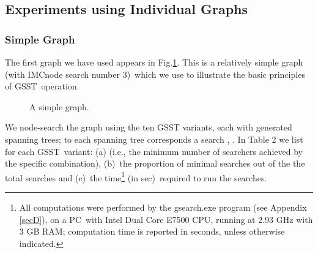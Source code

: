 \documentclass[11pt]{article}\usepackage{amsmath}
\begin{document}
\subsection{Experiments using Individual Graphs}

\label{sec0601}

\subsubsection{Simple Graph}

The first graph we have used appears in Fig.\ref{fig02}. This is a relatively
simple graph (with IMCnode search number 3)\ which we use to
illustrate the basic principles of GSST\ operation.

\begin{figure}[h]
\centering
{}\caption{A simple graph.}\label{fig02}\end{figure}

We node-search the graph using the ten GSST variants, each with 
generated spanning trees; to each spanning tree corresponds a search
, . In Table 2 we list for each GSST\ variant:
(a) (i.e.,
the minimum number of searchers achieved by the specific combination),
(b)\ the proportion of minimal searches out of the the  total searches and
(c)\ the time\footnote{All computations were performed by the gsearch.exe
program (see Appendix \ref{secD}), on a PC\ with Intel Dual Core E7500 CPU,
running at 2.93 GHz with 3 GB RAM; computation time is reported in seconds,
unless otherwise indicated.} (in sec)\ required to run the  searches.
\end{document}
